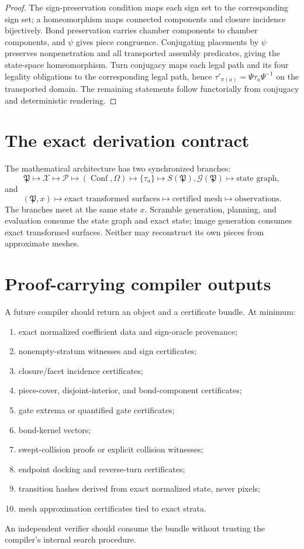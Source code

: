 \documentclass[11pt,openany]{book}
\newcommand{\Conf}{\operatorname{Conf}}
\newcommand{\Atlas}{\mathfrak P}
\newcommand{\Strat}{\mathscr X}
\newcommand{\Pieces}{\mathscr P}
\newcommand{\States}{\Omega}
\theoremstyle{polyplain}
\theoremstyle{polydef}
\begin{document}
\begin{proof}
The sign-preservation condition maps each sign set to the corresponding sign set; a homeomorphism maps connected components and closure incidence bijectively. Bond preservation carries chamber components to chamber components, and $\psi$ gives piece congruence. Conjugating placements by $\psi$ preserves nonpenetration and all transported assembly predicates, giving the state-space homeomorphism. Turn conjugacy maps each legal path and its four legality obligations to the corresponding legal path, hence $\tau'_{\pi(a)}=\Psi\tau_a\Psi^{-1}$ on the transported domain. The remaining statements follow functorially from conjugacy and deterministic rendering.
\end{proof}

\section{The exact derivation contract}

The mathematical architecture has two synchronized branches:
\[
\Atlas\longmapsto
\Strat\longmapsto
\Pieces\longmapsto
(\Conf,\States)\longmapsto
\{\tau_a\}\longmapsto
S(\Atlas),\mathcal G(\Atlas)\longmapsto
\text{state graph},
\]
and
\[
(\Atlas,x)\longmapsto
\text{exact transformed surfaces}\longmapsto
\text{certified mesh}\longmapsto
\text{observations}.
\]
The branches meet at the same state $x$. Scramble generation, planning, and evaluation consume the state graph and exact state; image generation consumes exact transformed surfaces. Neither may reconstruct its own pieces from approximate meshes.

\section{Proof-carrying compiler outputs}

A future compiler should return an object and a certificate bundle. At minimum:
\begin{enumerate}
  \item exact normalized coefficient data and sign-oracle provenance;
  \item nonempty-stratum witnesses and sign certificates;
  \item closure/facet incidence certificates;
  \item piece-cover, disjoint-interior, and bond-component certificates;
  \item gate extrema or quantified gate certificates;
  \item bond-kernel vectors;
  \item swept-collision proofs or explicit collision witnesses;
  \item endpoint docking and reverse-turn certificates;
  \item transition hashes derived from exact normalized state, never pixels;
  \item mesh approximation certificates tied to exact strata.
\end{enumerate}
An independent verifier should consume the bundle without trusting the compiler's internal search procedure.
\end{document}
